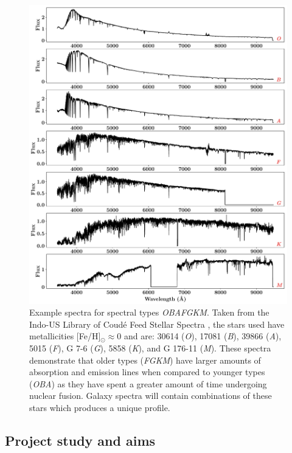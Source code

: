 \documentclass[12pt, twocolumn]{revtex4-1}    %
\begin{document}
\begin{figure}
\includegraphics[width=1.0\linewidth]{introduction/spectral_types}
\caption{Example spectra for spectral types \textit{OBAFGKM}. Taken from the Indo-US Library of Coudé Feed Stellar Spectra \citep{valdes_coude}, the stars used have metallicities [Fe/H]$_{\odot} \approx0$  and are: 30614 (\textit{O}), 17081 (\textit{B}), 39866 (\textit{A}), 5015 (\textit{F}), G 7-6 (\textit{G}), 5858 (\textit{K}), and G 176-11 (\textit{M}). These spectra demonstrate that older types (\textit{FGKM}) have larger amounts of absorption and emission lines when compared to younger types (\textit{OBA}) as they have spent a greater amount of time undergoing nuclear fusion. Galaxy spectra will contain combinations of these stars which produces a unique profile.}
\label{fig:spectral_types}
\end{figure}

\vspace{2ex} %
\subsection{Project study and aims} %
\noindent
\end{document}
